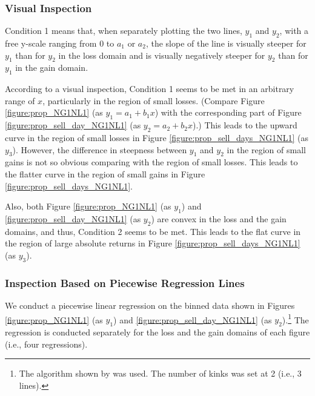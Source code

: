 \documentclass[11pt, a4paper]{article}
\begin{document}

\subsubsection{Visual Inspection}
Condition 1 means that, when separately plotting the two lines, $y_1$ and $y_2$, with a free y-scale ranging from 0 to $a_1$ or $a_2$, the slope of the line is visually steeper for $y_1$ than for $y_2$ in the loss domain and is visually negatively steeper for $y_2$ than for $y_1$ in the gain domain. 

According to a visual inspection, Condition 1 seems to be met in an arbitrary range of $x$, particularly in the region of small losses. (Compare Figure \ref{figure:prop_NG1NL1} (as $y_1=a_1+b_1x$) with the corresponding part of Figure \ref{figure:prop_sell_day_NG1NL1} (as $y_2=a_2+b_2x$).) This leads to the upward curve in the region of small losses in Figure \ref{figure:prop_sell_days_NG1NL1} (as $y_3$).
However, the difference in steepness between $y_1$ and $y_2$ in the region of small gains is not so obvious comparing with the region of small losses. This leads to the flatter curve in the region of small gains in Figure \ref{figure:prop_sell_days_NG1NL1}.


Also, both Figure \ref{figure:prop_NG1NL1} (as $y_1$) and \ref{figure:prop_sell_day_NG1NL1} (as $y_2$) are convex in the loss and the gain domains, and thus, Condition 2 seems to be met. This leads to the flat curve in the region of large absolute returns in Figure \ref{figure:prop_sell_days_NG1NL1} (as $y_3$).

\subsubsection{Inspection Based on Piecewise Regression Lines}
We conduct a piecewise linear regression on the binned data shown in Figures \ref{figure:prop_NG1NL1} (as $y_1$) and \ref{figure:prop_sell_day_NG1NL1} (as $y_2$).\footnote{The algorithm shown by \citet{muggeo2008} was used. The number of kinks was set at 2 (i.e., 3 lines).} The regression is conducted separately for the loss and the gain domains of each figure (i.e., four regressions). 
\end{document}
